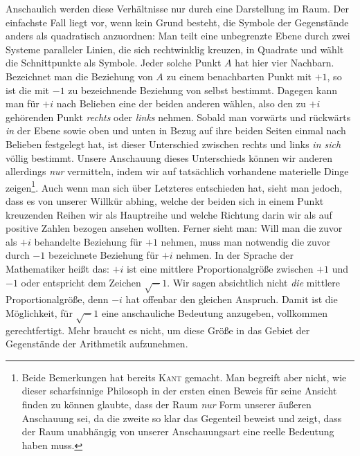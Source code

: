 Anschaulich werden diese Verhältnisse nur durch eine Darstellung
im Raum. Der einfachste Fall liegt vor, wenn kein Grund besteht, die Symbole der Gegenstände anders als quadratisch anzuordnen: Man teilt eine unbegrenzte Ebene durch zwei Systeme paralleler Linien, die sich rechtwinklig kreuzen, in Quadrate und wählt die Schnittpunkte als Symbole. Jeder solche Punkt $A$ hat hier vier Nachbarn. Bezeichnet man die Beziehung von $A$ zu einem benachbarten Punkt mit $+1$, so ist die mit $-1$ zu bezeichnende Beziehung von selbst bestimmt. Dagegen kann man für $+i$ nach Belieben eine der beiden anderen wählen, also den zu $+i$ gehörenden Punkt \emph{rechts} oder \emph{links} nehmen. Sobald man vorwärts und rückwärts \emph{in} der Ebene sowie oben und unten in Bezug auf ihre beiden Seiten einmal nach Belieben festgelegt hat, ist dieser Unterschied zwischen rechts und links \emph{in sich} völlig bestimmt. Unsere Anschauung dieses Unterschieds können wir anderen allerdings \emph{nur} vermitteln, indem wir auf tatsächlich vorhandene materielle Dinge zeigen\begingroup\renewcommand{\thefootnote}{*)}\footnote{Beide Bemerkungen hat bereits \textsc{Kant} gemacht. Man begreift aber nicht, wie dieser scharfsinnige Philosoph in der ersten einen Beweis für seine Ansicht finden zu können glaubte, dass der Raum \emph{nur} Form unserer äußeren Anschauung sei, da die zweite so klar das Gegenteil beweist und zeigt, dass der Raum unabhängig von unserer Anschauungsart eine reelle Bedeutung haben muss.}\endgroup. Auch wenn man sich über Letzteres entschieden hat, sieht man jedoch, dass es von unserer Willkür abhing, welche der beiden sich in einem Punkt kreuzenden Reihen wir als Hauptreihe und welche Richtung darin wir als auf positive Zahlen bezogen ansehen wollten. Ferner sieht man: Will man die zuvor als $+i$ behandelte Beziehung für $+1$ nehmen, muss man notwendig die zuvor durch $-1$ bezeichnete Beziehung für $+i$ nehmen. In der Sprache der Mathematiker heißt das: $+i$ ist eine mittlere Proportionalgröße zwischen $+1$ und $-1$ oder entspricht dem Zeichen $\surd-1$. Wir sagen absichtlich nicht \emph{die} mittlere Proportionalgröße, denn $-i$ hat offenbar den gleichen Anspruch. Damit ist die Möglichkeit, für $\surd-1$ eine anschauliche Bedeutung anzugeben, vollkommen gerechtfertigt. Mehr braucht es nicht, um diese Größe in das Gebiet der Gegenstände der Arithmetik aufzunehmen.

